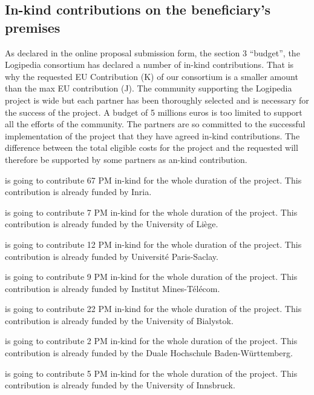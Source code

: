 \subsection*{In-kind contributions on the beneficiary’s premises}

As declared in the online proposal submission form, the section 3
``budget'', the Logipedia consortium has declared a number of in-kind
contributions. That is why the requested EU Contribution (K) of our
consortium is a smaller amount than the max EU contribution (J). The
community supporting the Logipedia project is wide but each partner
has been thoroughly selected and is necessary for the success of the
project.
A budget of 5 millions euros is too limited to support all
the efforts of the community.
The partners are so committed to the successful implementation of the
project that they have agreed in-kind contributions.
The difference between the total
eligible costs for the project and the requested will therefore be
supported by some partners as an-kind contribution.

 is going to contribute
67 PM in-kind for the whole duration of the project.
This contribution is already funded by Inria.


 is going to contribute 7 PM in-kind for the whole duration of the project.
This contribution is already funded by the University of Liège.

 is going to contribute 12 PM in-kind for the whole duration of the project.
This contribution is already funded by Université Paris-Saclay.

 is going to contribute 9 PM in-kind for the whole duration of the project.
This contribution is already funded by Institut Mines-Télécom.

 is going to contribute 22 PM in-kind for the whole duration of the project.
This contribution is already funded by the University of Bialystok.

 is going to contribute 2 PM in-kind for the whole duration of the project.
This contribution is already funded by the Duale Hochschule Baden-Württemberg.

 is going to contribute 5 PM in-kind for the whole duration of the project.
This contribution is already funded by the University of Innsbruck.

